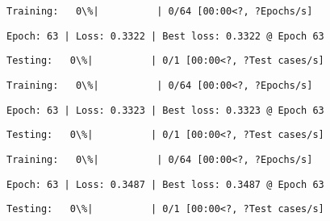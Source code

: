 \documentclass[11pt]{article}
\begin{document}
    
    
    \begin{Verbatim}[commandchars=\\\{\}]
Training:   0\%|          | 0/64 [00:00<?, ?Epochs/s]
    \end{Verbatim}

    
    \begin{Verbatim}[commandchars=\\\{\}]
Epoch: 63 | Loss: 0.3322 | Best loss: 0.3322 @ Epoch 63
    \end{Verbatim}

    
    \begin{Verbatim}[commandchars=\\\{\}]
Testing:   0\%|          | 0/1 [00:00<?, ?Test cases/s]
    \end{Verbatim}

    
    
    \begin{Verbatim}[commandchars=\\\{\}]
Training:   0\%|          | 0/64 [00:00<?, ?Epochs/s]
    \end{Verbatim}

    
    \begin{Verbatim}[commandchars=\\\{\}]
Epoch: 63 | Loss: 0.3323 | Best loss: 0.3323 @ Epoch 63
    \end{Verbatim}

    
    \begin{Verbatim}[commandchars=\\\{\}]
Testing:   0\%|          | 0/1 [00:00<?, ?Test cases/s]
    \end{Verbatim}

    
    
    \begin{Verbatim}[commandchars=\\\{\}]
Training:   0\%|          | 0/64 [00:00<?, ?Epochs/s]
    \end{Verbatim}

    
    \begin{Verbatim}[commandchars=\\\{\}]
Epoch: 63 | Loss: 0.3487 | Best loss: 0.3487 @ Epoch 63
    \end{Verbatim}

    
    \begin{Verbatim}[commandchars=\\\{\}]
Testing:   0\%|          | 0/1 [00:00<?, ?Test cases/s]
    \end{Verbatim}
\end{document}

